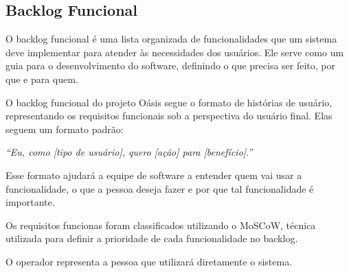 \subsection{Backlog Funcional}
O backlog funcional é uma lista organizada de funcionalidades que um sistema deve implementar para atender às necessidades dos usuários. Ele serve como um guia para o desenvolvimento do software, definindo o que precisa ser feito, por que e para quem.

O backlog funcional do projeto Oásis segue o formato de histórias de usuário, representando os requisitos funcionais sob a perspectiva do usuário final. Elas seguem um formato padrão:

\textit{“Eu, como [tipo de usuário], quero [ação] para [benefício].”}

Esse formato ajudará a equipe de software a entender quem vai usar a funcionalidade, o que a pessoa deseja fazer e por que tal funcionalidade é importante.

Os requisitos funcionas foram classificados utilizando o MoSCoW, técnica utilizada para definir a prioridade de cada funcionalidade no backlog.

O operador representa a pessoa que utilizará diretamente o sistema.

\setlength{\extrarowheight}{2pt}


